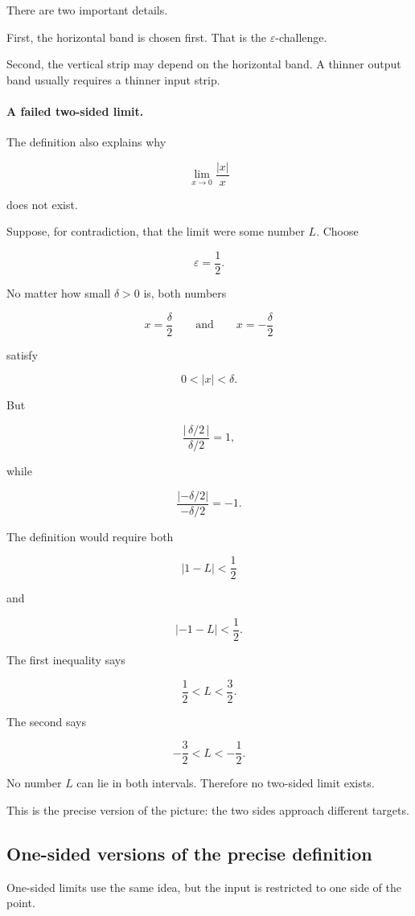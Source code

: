There are two important details.

First, the horizontal band is chosen first.  That is the \(\varepsilon\)-challenge.

Second, the vertical strip may depend on the horizontal band.  A thinner output band usually requires a thinner input strip.

\paragraph{A failed two-sided limit.}
The definition also explains why

\[
\lim_{x\to0}\frac{|x|}{x}
\]

does not exist.

Suppose, for contradiction, that the limit were some number \(L\).  Choose

\[
\varepsilon=\frac12.
\]

No matter how small \(\delta>0\) is, both numbers

\[
x=\frac{\delta}{2}
\qquad\text{and}\qquad
x=-\frac{\delta}{2}
\]

satisfy

\[
0<|x|<\delta.
\]

But

\[
\frac{|\,\delta/2\,|}{\delta/2}=1,
\]

while

\[
\frac{|-\delta/2|}{-\delta/2}=-1.
\]

The definition would require both

\[
|1-L|<\frac12
\]

and

\[
|-1-L|<\frac12.
\]

The first inequality says

\[
\frac12<L<\frac32.
\]

The second says

\[
-\frac32<L<-\frac12.
\]

No number \(L\) can lie in both intervals.  Therefore no two-sided limit exists.

This is the precise version of the picture: the two sides approach different targets.

\subsection{One-sided versions of the precise definition}
\label{subsec:one-sided-precise-definition}

One-sided limits use the same idea, but the input is restricted to one side of the point.

